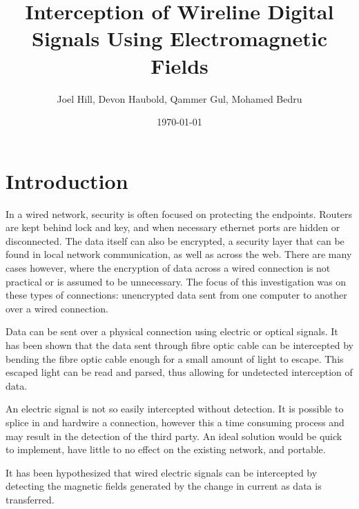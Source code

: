 \documentclass{article}
\begin{document}


\author{Joel Hill, Devon Haubold, Qammer Gul, Mohamed Bedru}
\title{Interception of Wireline Digital Signals Using Electromagnetic Fields}
\date{\today{}}
\maketitle{} %

\newpage{}
\tableofcontents{}
\newpage
{}
\section{Introduction}
In a wired network, security is often focused on protecting the endpoints. Routers are kept behind lock and key, and when necessary ethernet ports are hidden or disconnected. The data itself can also be encrypted, a security layer that can be found in local network communication, as well as across the web. There are many cases however, where the encryption of data across a wired connection is not practical or is assumed to be unnecessary. The focus of this investigation was on these types of connections: unencrypted data sent from one computer to another over a wired connection.

Data can be sent over a physical connection using electric or optical signals. It has been shown that the data sent through fibre optic cable can be intercepted by bending the fibre optic cable enough for a small amount of light to escape. This escaped light can be read and parsed, thus allowing for undetected interception of data. 

An electric signal is not so easily intercepted without detection. It is possible to splice in and hardwire a connection, however this a time consuming process and may result in the detection of the third party. An ideal solution would be quick to implement, have little to no effect on the existing network, and portable. 

It has been hypothesized that wired electric signals can be intercepted by detecting the magnetic fields generated by the change in current as data is transferred.
\end{document}
